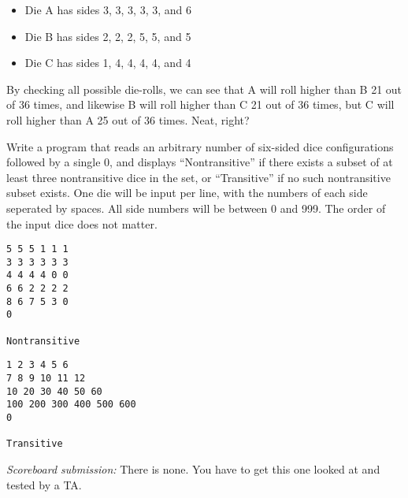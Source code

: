\documentclass[11pt]{cselabheader}
\theoremstyle{plain}
\begin{document}
\begin{enumerate}
          \begin{itemize}
	  \item Die A has sides 3, 3, 3, 3, 3, and 6
	  \item Die B has sides 2, 2, 2, 5, 5, and 5
	  \item Die C has sides 1, 4, 4, 4, 4, and 4
          \end{itemize}
          By checking all possible die-rolls, we can see that A will roll
          higher than B 21 out of 36 times, and likewise B will roll higher
          than C 21 out of 36 times, but C will roll higher than A 25 out
          of 36 times. Neat, right?
          
          Write a program that reads an arbitrary number of six-sided dice
          configurations followed by a single 0, and displays
          ``Nontransitive'' if there exists a subset of at least three
          nontransitive dice in the set, or ``Transitive'' if no such
          nontransitive subset exists. One die will be input per line,
          with the numbers of each side seperated by spaces. All side
          numbers will be between 0 and 999. The order of the input dice
          does not matter.

          \begin{minipage}{.5\linewidth}
            \begin{minipage}{.9\linewidth}
              \begin{lstlisting}[style=bash]
5 5 5 1 1 1
3 3 3 3 3 3
4 4 4 4 0 0
6 6 2 2 2 2
8 6 7 5 3 0
0

Nontransitive
              \end{lstlisting}
            \end{minipage}
          \end{minipage}
          \begin{minipage}{.5\linewidth}
            \begin{minipage}{.9\linewidth}
              \begin{lstlisting}[style=bash]
1 2 3 4 5 6
7 8 9 10 11 12
10 20 30 40 50 60
100 200 300 400 500 600
0

Transitive
              \end{lstlisting}
            \end{minipage}
          \end{minipage}

          \textit{Scoreboard submission:} There is none. You have to get this
          one looked at and tested by a TA.
          
\end{enumerate}
\pagebreak
\end{document}
